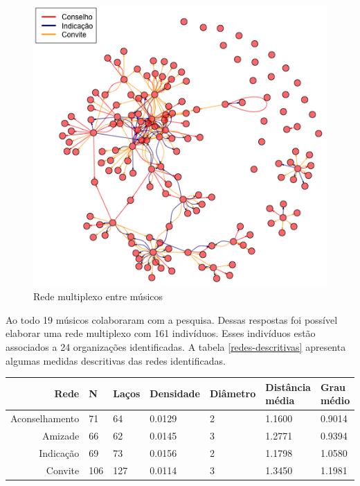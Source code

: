 \documentclass[a4paper, 12pt, openright, oneside, german, french, english, brazil]{abntex2}
\begin{document}
	\begin{figure}[!ht]
		\centering
		\caption{Rede multiplexo entre músicos}
		\label{rede-multiplexo}
		\includegraphics[scale=.7]{rede_multiplexo.png}
	\end{figure}



	Ao todo 19 músicos colaboraram com a pesquisa. Dessas respostas foi possível elaborar uma rede multiplexo com 161 indivíduos. Esses indivíduos estão associados a 24 organizações identificadas. A tabela \ref{redes-descritivas} apresenta algumas medidas descritivas das redes identificadas.

	\begin{table}[!ht]
		{\begin{tabular}{rllllp{1.5cm}p{1.5cm}}
			\hline
			\textbf{Rede} & \textbf{N} & \textbf{Laços} & \textbf{Densidade} & \textbf{Diâmetro} & \textbf{Distância média} & \textbf{Grau médio}  \\ 
			\hline
			Aconselhamento & 71 & 64 & 0.0129 & 2 & 1.1600 & 0.9014 \\ 
			Amizade & 66 & 62 & 0.0145 & 3 & 1.2771 & 0.9394  \\ 
			Indicação & 69 & 73 & 0.0156 & 2 & 1.1798 & 1.0580 \\ 
			Convite & 106 & 127 & 0.0114 & 3 & 1.3450 & 1.1981 \\  
			\hline
		\end{tabular}
	}
	{}
	\end{table}
\end{document}
